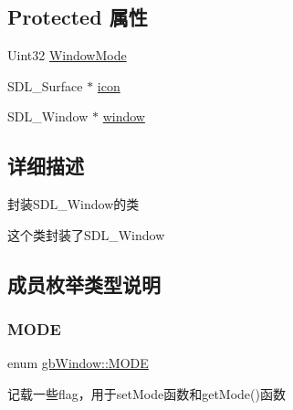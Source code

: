 \subsection*{Protected 属性}
\begin{DoxyCompactItemize}
\item 
Uint32 \mbox{\hyperlink{classgb_window_a60b7748425bf49fdf563c870a13c6e07}{Window\+Mode}}
\item 
S\+D\+L\+\_\+\+Surface $\ast$ \mbox{\hyperlink{classgb_window_ad6ff49981281025fd5b027277d693e24}{icon}}
\item 
S\+D\+L\+\_\+\+Window $\ast$ \mbox{\hyperlink{classgb_window_a1faf26696f9974e05cae77fb240a502e}{window}}
\end{DoxyCompactItemize}


\subsection{详细描述}
封装\+S\+D\+L\+\_\+\+Window的类 

这个类封装了\+S\+D\+L\+\_\+\+Window 

\subsection{成员枚举类型说明}
\mbox{\label{classgb_window_a19e70d277e17598ddb3c229e28dbb9e9}} 
\subsubsection{\texorpdfstring{MODE}{MODE}}
{\footnotesize\ttfamily enum \mbox{\hyperlink{classgb_window_a19e70d277e17598ddb3c229e28dbb9e9}{gb\+Window\+::\+M\+O\+DE}}}



记载一些flag，用于set\+Mode函数和get\+Mode()函数 

